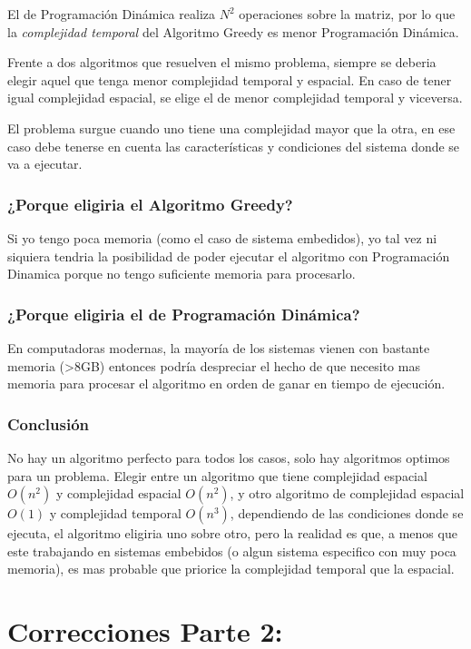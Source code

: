 \documentclass[titlepage,a4paper]{article}
\begin{document}
El de Programación Dinámica realiza \(N^2\) operaciones sobre la matriz, por lo que
la \emph{complejidad temporal} del Algoritmo Greedy es menor Programación Dinámica.

Frente a dos algoritmos que resuelven el mismo problema, siempre se deberia
elegir aquel que tenga menor complejidad temporal y espacial. En caso de tener
igual complejidad espacial, se elige el de menor complejidad temporal y
viceversa.

El problema surgue cuando uno tiene una complejidad mayor que la otra,
en ese caso debe tenerse en cuenta las características y condiciones 
del sistema donde se va a ejecutar.

\subsubsection{¿Porque eligiria el Algoritmo Greedy?}
\label{sec:org96c8d9e}
Si yo tengo poca memoria (como el caso de sistema embedidos), yo tal vez ni
siquiera tendria la posibilidad de poder ejecutar el algoritmo con Programación
Dinamica porque no tengo suficiente memoria para procesarlo.

\subsubsection{¿Porque eligiria el de Programación Dinámica?}
\label{sec:org72d1289}
En computadoras modernas, la mayoría de los sistemas vienen con bastante memoria
(>8GB) entonces podría despreciar el hecho de que necesito mas memoria para
procesar el algoritmo en orden de ganar en tiempo de ejecución.

\subsubsection{Conclusión}
\label{sec:org558eeb1}
No hay un algoritmo perfecto para todos los casos, solo hay algoritmos optimos
para un problema. Elegir entre un algoritmo que tiene complejidad espacial
\(O(n^2)\) y complejidad espacial \(O(n^2)\), y otro algoritmo de complejidad espacial
\(O(1)\) y complejidad temporal \(O(n^3)\), dependiendo de las condiciones donde se
ejecuta, el algoritmo eligiria uno sobre otro, pero la realidad es que, a menos
que este trabajando en sistemas embebidos (o algun sistema especifico con muy
poca memoria), es mas probable que priorice la complejidad temporal que la
espacial.
\pagebreak
\section{Correcciones Parte 2:}
\label{sec:org93be25f}
\end{document}
